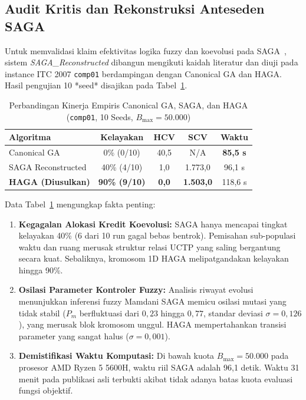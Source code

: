 \documentclass[journal]{IEEEtran}
\begin{document}
\subsection{Audit Kritis dan Rekonstruksi Anteseden SAGA}
Untuk memvalidasi klaim efektivitas logika fuzzy dan koevolusi pada SAGA~\cite{pamungkas2025saga}, sistem \textit{SAGA\_Reconstructed} dibangun mengikuti kaidah literatur dan diuji pada instance ITC 2007 \texttt{comp01} berdampingan dengan Canonical GA dan HAGA. Hasil pengujian 10 *seed* disajikan pada Tabel~\ref{tab:saga_comp}.

\begin{table}[!t]
\caption{Perbandingan Kinerja Empiris Canonical GA, SAGA, dan HAGA (\texttt{comp01}, 10 Seeds, $B_{\max} = 50.000$)}
\label{tab:saga_comp}
\centering
\scriptsize
\begin{tabular}{l c c c c}
\toprule
\textbf{Algoritma} & \textbf{Kelayakan} & \textbf{HCV} & \textbf{SCV} & \textbf{Waktu} \\
\midrule
Canonical GA & 0\% (0/10) & 40,5 & N/A & \textbf{85,5 s} \\
SAGA Reconstructed & 40\% (4/10) & 1,0 & 1.773,0 & 96,1 s \\
\textbf{HAGA (Diusulkan)} & \textbf{90\% (9/10)} & \textbf{0,0} & \textbf{1.503,0} & 118,6 s \\
\bottomrule
\end{tabular}
\end{table}

Data Tabel~\ref{tab:saga_comp} mengungkap fakta penting:
\begin{enumerate}
    \item \textbf{Kegagalan Alokasi Kredit Koevolusi:} SAGA hanya mencapai tingkat kelayakan 40\% (6 dari 10 run gagal bebas bentrok). Pemisahan sub-populasi waktu dan ruang merusak struktur relasi UCTP yang saling bergantung secara kuat. Sebaliknya, kromosom 1D HAGA melipatgandakan kelayakan hingga 90\%.
    \item \textbf{Osilasi Parameter Kontroler Fuzzy:} Analisis riwayat evolusi menunjukkan inferensi fuzzy Mamdani SAGA memicu osilasi mutasi yang tidak stabil ($P_m$ berfluktuasi dari $0{,}23$ hingga $0{,}77$, standar deviasi $\sigma = 0{,}126$), yang merusak blok kromosom unggul. HAGA mempertahankan transisi parameter yang sangat halus ($\sigma = 0{,}001$).
    \item \textbf{Demistifikasi Waktu Komputasi:} Di bawah kuota $B_{\max} = 50.000$ pada prosesor AMD Ryzen 5 5600H, waktu riil SAGA adalah 96,1 detik. Waktu 31 menit pada publikasi asli terbukti akibat tidak adanya batas kuota evaluasi fungsi objektif.
\end{enumerate}
\end{document}
